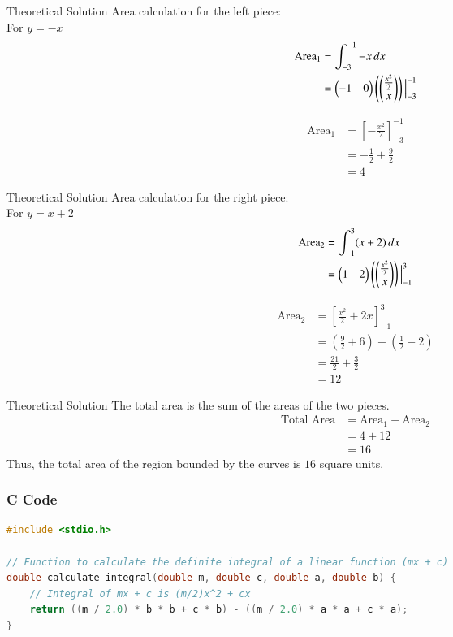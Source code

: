 \documentclass{beamer}
\begin{document}
\begin{frame}{Theoretical Solution}
Area calculation for the left piece:\\
For $y=-x$ 
\begin{align}
    \text{Area}_1 &= \int_{-3}^{-1} -x \,dx \\
    &= \begin{pmatrix}-1 & 0\end{pmatrix} \left( \begin{pmatrix}\tfrac{x^2}{2} \\ x\end{pmatrix} \right) \Big|_{-3}^{-1}
\end{align}

\begin{align}
    \text{Area}_1 &= \left[ -\frac{x^2}{2} \right]_{-3}^{-1} \\
    &= -\frac{1}{2} + \frac{9}{2} \\
    &= 4
\end{align}
\end{frame}

\begin{frame}{Theoretical Solution}
Area calculation for the right piece:\\
For $y=x+2$
\begin{align}
    \text{Area}_2 &= \int_{-1}^{3} (x+2) \,dx \\
    &= \begin{pmatrix}1 & 2\end{pmatrix} \left( \begin{pmatrix}\tfrac{x^2}{2} \\ x\end{pmatrix} \right) \Big|_{-1}^{3}
\end{align}

\begin{align}
    \text{Area}_2 &= \left[ \frac{x^2}{2} + 2x \right]_{-1}^{3} \\
    &= \left( \frac{9}{2} + 6 \right) - \left( \frac{1}{2} - 2 \right) \\
    &= \frac{21}{2} + \frac{3}{2} \\
    &= 12
\end{align}
\end{frame}

\begin{frame}{Theoretical Solution}
The total area is the sum of the areas of the two pieces.
\begin{align}
    \text{Total Area} &= \text{Area}_1 + \text{Area}_2 \\
    &= 4 + 12 \\
    &= 16
\end{align}
Thus, the total area of the region bounded by the curves is $16$ square units.
\end{frame}

\begin{frame}[fragile]
\frametitle{C Code}
\begin{lstlisting}[language=C]
#include <stdio.h>

// Function to calculate the definite integral of a linear function (mx + c)
double calculate_integral(double m, double c, double a, double b) {
    // Integral of mx + c is (m/2)x^2 + cx
    return ((m / 2.0) * b * b + c * b) - ((m / 2.0) * a * a + c * a);
}
\end{lstlisting}
\end{frame}
\end{document}

